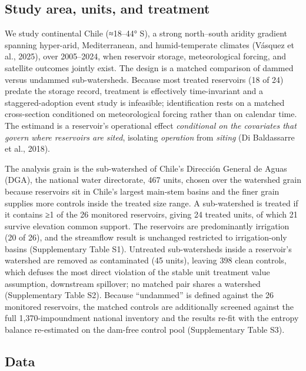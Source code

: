 \documentclass[
]{agujournal2019}
\begin{document}
\subsection{Study area, units, and
treatment}\label{study-area-units-and-treatment}

We study continental Chile (≈18--44° S), a strong north--south aridity
gradient spanning hyper-arid, Mediterranean, and humid-temperate
climates (Vásquez et al., 2025), over 2005--2024, when reservoir
storage, meteorological forcing, and satellite outcomes jointly exist.
The design is a matched comparison of dammed versus undammed
sub-watersheds. Because most treated reservoirs (18 of 24) predate the
storage record, treatment is effectively time-invariant and a
staggered-adoption event study is infeasible; identification rests on a
matched cross-section conditioned on meteorological forcing rather than
on calendar time. The estimand is a reservoir's operational effect
\emph{conditional on the covariates that govern where reservoirs are
sited}, isolating \emph{operation} from \emph{siting} (Di Baldassarre et
al., 2018).

The analysis grain is the sub-watershed of Chile's Dirección General de
Aguas (DGA), the national water directorate, 467 units, chosen over the
watershed grain because reservoirs sit in Chile's largest main-stem
basins and the finer grain supplies more controls inside the treated
size range. A sub-watershed is treated if it contains ≥1 of the 26
monitored reservoirs, giving 24 treated units, of which 21 survive
elevation common support. The reservoirs are predominantly irrigation
(20 of 26), and the streamflow result is unchanged restricted to
irrigation-only basins (Supplementary Table S1). Untreated
sub-watersheds inside a reservoir's watershed are removed as
contaminated (45 units), leaving 398 clean controls, which defuses the
most direct violation of the stable unit treatment value assumption,
downstream spillover; no matched pair shares a watershed (Supplementary
Table S2). Because ``undammed'' is defined against the 26 monitored
reservoirs, the matched controls are additionally screened against the
full 1,370-impoundment national inventory and the results re-fit with
the entropy balance re-estimated on the dam-free control pool
(Supplementary Table S3).

\subsection{Data}\label{data}
\end{document}
